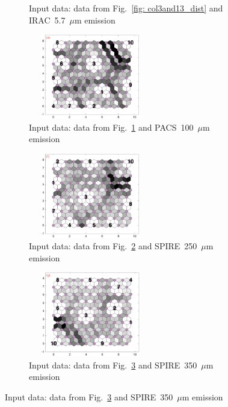\begin{figure}
\begin{subfigure}[b]{0.25\textwidth}
        \caption{Input data: data from Fig.~\ref{fig: col3and13_dist} and IRAC~5.7~$\mu$m emission}
        \label{fig: col3and14_dist}
    \end{subfigure}
        \hfill
    \begin{subfigure}[b]{0.25\textwidth}
        \centering
        \includegraphics[width=54mm, height=37mm]{../../images0.01/M31/2D/diff_dimension/combine_2D_data_between_cols3and15.png}
        \caption{Input data: data from Fig.~\ref{fig: col3and14_dist} and PACS~100~$\mu$m emission }
        \label{fig: col3and15_dist}
    \end{subfigure}
        \hfill
    \begin{subfigure}[b]{0.25\textwidth}
        \centering
        \includegraphics[width=54mm, height=37mm]{../../images0.01/M31/2D/diff_dimension/combine_2D_data_between_cols3and16.png}
        \caption{Input data: data from Fig.~\ref{fig: col3and15_dist} and SPIRE~250~$\mu$m emission }
        \label{fig: col3and16_dist}
    \end{subfigure}
        \hfill
    \begin{subfigure}[b]{0.25\textwidth}
        \centering
        \includegraphics[width=54mm, height=37mm]{../../images0.01/M31/2D/diff_dimension/combine_2D_data_between_cols3and17.png}
        \caption{Input data: data from Fig.~\ref{fig: col3and16_dist} and SPIRE~350~$\mu$m emission }

\end{subfigure}
\end{figure}
